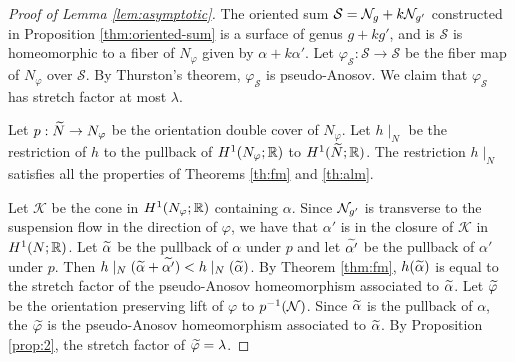 \begin{proof}[Proof of Lemma \ref{lem:asymptotic}]
The oriented sum $\mathcal{S}=\mathcal{N}_g+k\mathcal{N}_{g'}$ constructed in Proposition \ref{thm:oriented-sum} is a surface of genus $g+kg'$, and is $\mathcal{S}$ is homeomorphic to a fiber of $N_\varphi$ given by $\alpha+k\alpha'$.  Let $\varphi_{\mathcal{S}}:\mathcal{S}\rightarrow\mathcal{S}$ be the fiber map of $N_\varphi$ over $\mathcal{S}$.  By Thurston's theorem, $\varphi_{\mathcal{S}}$ is pseudo-Anosov.  We claim that $\varphi_{\mathcal{S}}$ has stretch factor at most $\lambda$.

Let $p:\widetilde{N}\rightarrow N_\varphi$ be the orientation double cover of $N_\varphi$. Let $h\mid_{N}$ be the restriction of $h$ to the pullback of $H^1(N_\varphi; \mathbb{R})$ to $H^1(\widetilde{N}; \mathbb{R})$.
The restriction $h\mid_N$ satisfies all the properties of Theorems \ref{th:fm} and \ref{th:alm}.

Let $\mathcal{K}$ be the cone in $H^1(N_\varphi;\mathbb{R})$ containing $\alpha$.  Since $\mathcal{N}_{g'}$ is transverse to the suspension flow in the direction of $\varphi$, we have that $\alpha'$ is in the closure of $\mathcal{K}$ in $H^1(N;\mathbb{R})$.  Let $\widetilde{\alpha}$ be the pullback of $\alpha$ under $p$ and let $\widetilde{\alpha'}$ be the pullback of $\alpha'$ under $p$.  Then $h\mid_N(\widetilde{\alpha}+\widetilde{\alpha'})<h\mid_N(\widetilde{\alpha})$.  By Theorem \ref{thm:fm}, $h(\widetilde{\alpha})$ is equal to the stretch factor of the pseudo-Anosov homeomorphism associated to $\widetilde{\alpha}$. Let $\widetilde{\varphi}$ be the orientation preserving lift of $\varphi$ to $p^{-1}(\mathcal{N})$.  Since $\widetilde{\alpha}$ is the pullback of $\alpha$, the $\widetilde{\varphi}$ is the pseudo-Anosov homeomorphism associated to $\widetilde{\alpha}$.  By Proposition \ref{prop:2}, the stretch factor of $\widetilde{\varphi}=\lambda$.
\end{proof}


